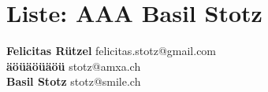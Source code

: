 \documentclass{scrartcl}
\begin{document}
\section*{Liste: AAA Basil Stotz}
\textbf{Felicitas Rützel                            } felicitas.stotz@gmail.com\\
\textbf{äöüäöüäöü                           } stotz@amxa.ch\\
\textbf{Basil Stotz } stotz@smile.ch\\
\end{document}
